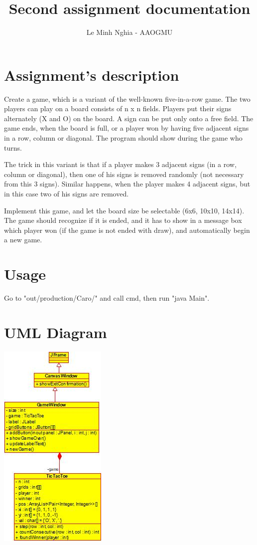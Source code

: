 \documentclass[a4paper, 12pt]{report}
\begin{document}
\title{Second assignment documentation}
\author{Le Minh Nghia - AAOGMU}
\maketitle
{}
\tableofcontents

\chapter{Assignment's description}
	Create a game, which is a variant of the well-known five-in-a-row game. The two players can play on
a board consists of n x n fields. Players put their signs alternately (X and O) on the board. A sign can
be put only onto a free field. The game ends, when the board is full, or a player won by having five
adjacent signs in a row, column or diagonal. The program should show during the game who turns.

The trick in this variant is that if a player makes 3 adjacent signs (in a row, column or diagonal), then
one of his signs is removed randomly (not necessary from this 3 signs). Similar happens, when the
player makes 4 adjacent signs, but in this case two of his signs are removed.

Implement this game, and let the board size be selectable (6x6, 10x10, 14x14). The game should
recognize if it is ended, and it has to show in a message box which player won (if the game is not
ended with draw), and automatically begin a new game.

\chapter{Usage}

Go to "out/production/Caro/" and call cmd, then run "java Main".

\chapter{UML Diagram}
\includegraphics[scale=1.0]{class_diagram.jpeg}
\end{document}

